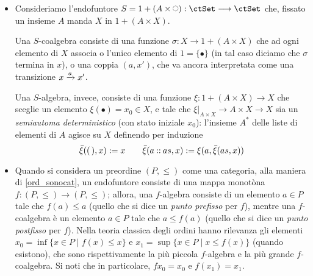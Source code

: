\begin{examples}
\begin{itemize}
		      Si noti che il funtore \(\ctP_\bbN\) è puntato da una trasformazione naturale \(\eta\) con componenti \(\eta_X : X\to \ctP(\bbN\times X)\), definite da \(x\mapsto\{(0,x)\}\). \`E allora naturale considerare le \(\ctP_\bbN\)-algebre \emph{puntate}, ma descriverle esplicitamente è complicato: se \(U\subseteq \bbN\times X\) e \((x,n)\in U\) diciamo che \(x\) ha peso \(n\); una funzione \(\alpha : \ctP_\bbN X\to X\) consiste di una funzione che ad ogni sottoinsieme di \(\bbN\times X\) associa un elemento di \(X\) che può essere pensato come un insieme di `preferenze' in un insieme \(X\) di candidati, \(\bbN\) è un insieme (infinito, numerabile) di elettori. Ogni sottoinsieme di \(\bbN \times X\) è un insieme di preferenze che gli elettori esprimono (si consentono voti multipli: la relazione \(R\subseteq \bbN\times X\) si legge `\(n\) vota per \(x\)'). Quindi, l'algebra seleziona il candidato in base alle preferenze di voto. Gli omomorfismi di algebre sono quelle funzioni che rispettano le preferenze di voto, e l'elemento \(\alpha(\varnothing)\in X\) è il candidato selezionato se nessuno si presenta alle urne.
		\item Consideriamo l'endofuntore \(S=1+(A\times\blank):\ctSet\fun\ctSet\) che, fissato un insieme \(A\) manda \(X\) in \(1+(A\times X)\).

		      Una \(S\)-coalgebra consiste di una funzione \(\sigma : X\to 1+(A\times X)\) che ad ogni elemento di \(X\) associa o l'unico elemento di \(1=\{\bullet\}\) (in tal caso diciamo che \(\sigma\) termina in \(x\)), o una coppia \((a,x')\), che va ancora interpretata come una transizione \(x\xrightarrow{a}x'\).

		      Una \(S\)-algebra, invece, consiste di una funzione \(\xi : 1+(A\times X)\to X\) che sceglie un elemento \(\xi(\bullet)=x_0\in X\), e tale che \(\xi|_{A\times X}\to A\times X\to X\) sia un \emph{semiautoma deterministico} (con stato iniziale \(x_0\)): l'insieme \(A^*\) delle liste di elementi di \(A\) agisce su \(X\) definendo per induzione
		      \[\bar\xi((\,),x):=x \qquad \bar\xi(a\mathbin{::} as,x) := \xi(a, \bar\xi(as,x))\]
		\item Quando si considera un preordine \((P,\le)\) come una categoria, alla maniera di \ref{ord_sonocat}, un endofuntore consiste di una mappa monotòna \(f : (P,\le) \to (P,\le)\); allora, una \(f\)-algebra consiste di un elemento \(a\in P\) tale che \(f(a) \le a\) (quello che si dice un \emph{punto prefisso} per \(f\)), mentre una \(f\)-coalgebra è un elemento \(a\in P\) tale che \(a \le f(a)\) (quello che si dice un \emph{punto postfisso} per \(f\)). Nella teoria classica degli ordini hanno rilevanza gli elementi \(x_0=\inf\{x\in P \mid f(x) \le x\}\) e \(x_1=\sup\{x\in P \mid x \le f(x)\}\) (quando esistono), che sono rispettivamente la più piccola \(f\)-algebra e la più grande \(f\)-coalgebra. Si noti che in particolare, \(fx_0=x_0\) e \(f(x_1)=x_1\).
	\end{itemize}
\end{examples}
